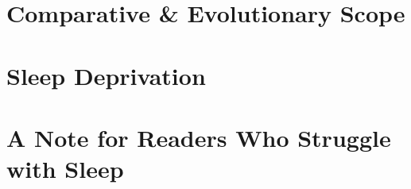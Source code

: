 \chapter{Comparative \& Evolutionary Scope}\label{ch:evolution}



\chapter{Sleep Deprivation}\label{ch:what_fails}





\chapter{A Note for Readers Who Struggle with Sleep}\label{ch:note_for_readers}


\newpage